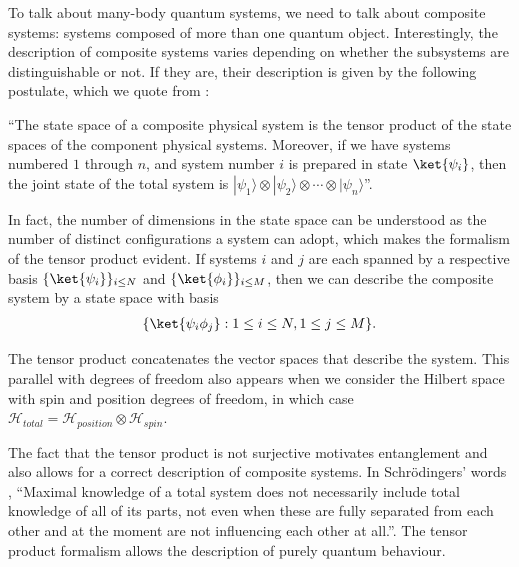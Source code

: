 To talk about many-body quantum systems, we need to talk about composite systems: systems composed of more than one quantum object. Interestingly, the description of composite systems varies depending on whether the subsystems are distinguishable or not. If they are, their description is given by the following postulate, which we quote from \cite{nielsen2010quantum}:
\begin{postulate}
``The state space of a composite physical system is the tensor product of the state spaces of the component physical systems. Moreover, if we have systems numbered $1$ through $n$, and system number $i$ is prepared in state $\ket{\psi_i}$, then the joint state of the total system is $|\psi_1\rangle \otimes |\psi_2\rangle \otimes \cdots \otimes |\psi_n\rangle$''.    
\end{postulate}
In fact, the number of dimensions in the state space can be understood as the number of distinct configurations a system can adopt, which makes the formalism of the tensor product evident. If systems $i$ and $j$ are each spanned by a respective basis $\{\ket{\psi_i}\}_{i \le N}$ and $\{\ket{\phi_i}\}_{i \le M}$, then we can describe the composite system by a state space with basis
\begin{align*}
    \{\ket{\psi_i \phi_j} : 1 \leq i \leq N,  1 \leq j \leq M\}.
\end{align*}

The tensor product concatenates the vector spaces that describe the system. This parallel with degrees of freedom also appears when we consider the Hilbert space with spin and position degrees of freedom, in which case $\mathcal{H}_{total} = \mathcal{H}_{position} \otimes \mathcal{H}_{spin}$.

The fact that the tensor product is not surjective motivates entanglement and also allows for a correct description of composite systems. In Schrödingers' words \cite{schrodinger1935gegenwartige}, ``Maximal knowledge of a total system does not necessarily include total knowledge of all of its parts, not even when these are fully separated from each other and at the moment are not influencing each other at all.''. The tensor product formalism allows the description of purely quantum behaviour. 

